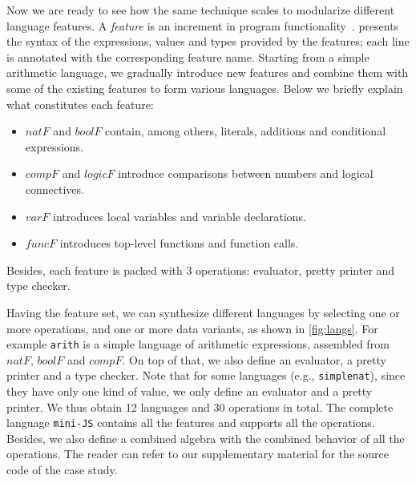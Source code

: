 Now we are ready to see how the same technique scales to modularize different
language features. A \emph{feature} is an increment in program
functionality~\citep{zave1999faq,lopez2005evaluating}. 
presents the syntax of the expressions, values and types provided by the
features; each line is annotated with the corresponding feature name. Starting from a
simple arithmetic language, we gradually introduce new features and combine them
with some of the existing features to form various languages. Below we briefly
explain what constitutes each feature:
\begin{itemize}
\item $\mathit{natF}$ and $\mathit{boolF}$ contain, among others, literals, additions and conditional expressions.
\item $\mathit{compF}$ and $\mathit{logicF}$ introduce comparisons between numbers and logical connectives.
\item $\mathit{varF}$ introduces local variables and variable declarations.
\item $\mathit{funcF}$ introduces top-level functions and function calls.
\end{itemize}
Besides, each feature is packed with 3 operations: evaluator, pretty
printer and type checker.

Having the feature set, we can synthesize different languages by selecting one
or more operations, and one or more data variants, as shown in \cref{fig:langs}.
For example \lstinline{arith} is a simple language of arithmetic expressions,
assembled from $\mathit{natF}$, $\mathit{boolF}$ and $\mathit{compF}$. On top of
that, we also define an evaluator, a pretty printer and a type checker. Note
that for some languages (e.g., \lstinline{simplenat}), since they have only one
kind of value, we only define an evaluator and a pretty printer. We thus obtain
12 languages and 30 operations in total. The complete language
\lstinline{mini-JS} contains all the features and supports all the operations.
Besides, we also define a combined algebra with the combined behavior of all the operations.
The reader can refer to our supplementary material for the source code of the case study.


